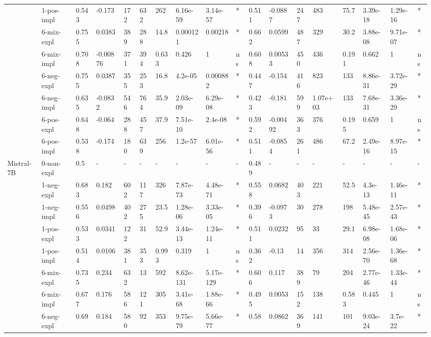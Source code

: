 \begin{table}[hp]
{\begin{adjustbox}{max width=\textwidth}
\begin{tabular}{ll|llllllll|llllllll}
 & 1-pos-impl & 0.543 & -0.173 & 172 & 632 & 262 & 6.16e-59 & 3.14e-57 & * & 0.511 & -0.0887 & 247 & 483 & 75.7 & 3.39e-18 & 1.29e-16 & * \\
 & 6-mix-expl & 0.755 & 0.0383 & 389 & 288 & 14.8 & 0.000121 & 0.00218 & * & 0.662 & 0.0599 & 487 & 329 & 30.2 & 3.88e-08 & 9.71e-07 & * \\
 & 6-mix-impl & 0.708 & -0.00876 & 371 & 394 & 0.633 & 0.426 & 1 & ns & 0.608 & 0.00533 & 450 & 436 & 0.191 & 0.662 & 1 & ns \\
 & 6-neg-expl & 0.755 & 0.0387 & 355 & 253 & 16.8 & 4.2e-05 & 0.000882 & * & 0.447 & -0.154 & 416 & 823 & 133 & 8.86e-31 & 3.72e-29 & * \\
 & 6-neg-impl & 0.635 & -0.0832 & 546 & 764 & 35.9 & 2.03e-09 & 6.29e-08 & * & 0.423 & -0.181 & 599 & 1.07e+03 & 133 & 7.68e-31 & 3.36e-29 & * \\
 & 6-pos-expl & 0.648 & -0.064 & 288 & 457 & 37.9 & 7.51e-10 & 2.4e-08 & * & 0.592 & -0.00492 & 363 & 376 & 0.195 & 0.659 & 1 & ns \\
 & 6-pos-impl & 0.538 & -0.174 & 180 & 639 & 256 & 1.2e-57 & 6.01e-56 & * & 0.511 & -0.0854 & 261 & 486 & 67.2 & 2.49e-16 & 8.97e-15 & * \\
\midrule
\multirow[t]{11}{*}{Mistral-7B} & 0-non-expl & 0.5 & - & - & - & - & - & - & - & 0.489 & - & - & - & - & - & - & - \\
 & 1-neg-expl & 0.683 & 0.182 & 602 & 117 & 326 & 7.87e-73 & 4.48e-71 & * & 0.558 & 0.0682 & 403 & 221 & 52.5 & 4.3e-13 & 1.46e-11 & * \\
 & 1-neg-impl & 0.556 & 0.0498 & 402 & 275 & 23.5 & 1.28e-06 & 3.33e-05 & * & 0.396 & -0.0973 & 30 & 278 & 198 & 5.48e-45 & 2.57e-43 & * \\
 & 1-pos-expl & 0.533 & 0.0341 & 122 & 31 & 52.9 & 3.44e-13 & 1.24e-11 & * & 0.511 & 0.0232 & 95 & 33 & 29.1 & 6.98e-08 & 1.68e-06 & * \\
 & 1-pos-impl & 0.514 & 0.0106 & 381 & 353 & 0.993 & 0.319 & 1 & ns & 0.362 & -0.13 & 14 & 356 & 314 & 2.56e-70 & 1.36e-68 & * \\
 & 6-mix-expl & 0.735 & 0.234 & 632 & 13 & 592 & 8.62e-131 & 5.17e-129 & * & 0.606 & 0.117 & 389 & 79 & 204 & 2.77e-46 & 1.33e-44 & * \\
 & 6-mix-impl & 0.677 & 0.176 & 586 & 121 & 305 & 3.41e-68 & 1.88e-66 & * & 0.495 & 0.0053 & 152 & 138 & 0.583 & 0.445 & 1 & ns \\
 & 6-neg-expl & 0.69 & 0.184 & 580 & 92 & 353 & 9.75e-79 & 5.66e-77 & * & 0.58 & 0.0862 & 369 & 141 & 101 & 9.03e-24 & 3.7e-22 & * \\

\end{tabular}
\end{adjustbox}}
\end{table}
